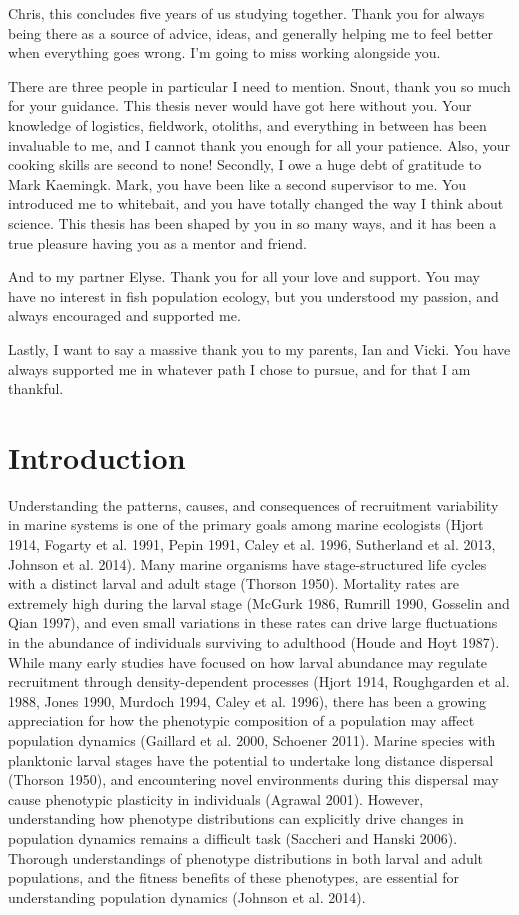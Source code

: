 \documentclass[]{book}
\begin{document}
Chris, this concludes five years of us studying together. Thank you for
always being there as a source of advice, ideas, and generally helping
me to feel better when everything goes wrong. I'm going to miss working
alongside you.

There are three people in particular I need to mention. Snout, thank you
so much for your guidance. This thesis never would have got here without
you. Your knowledge of logistics, fieldwork, otoliths, and everything in
between has been invaluable to me, and I cannot thank you enough for all
your patience. Also, your cooking skills are second to none! Secondly, I
owe a huge debt of gratitude to Mark Kaemingk. Mark, you have been like
a second supervisor to me. You introduced me to whitebait, and you have
totally changed the way I think about science. This thesis has been
shaped by you in so many ways, and it has been a true pleasure having
you as a mentor and friend.

And to my partner Elyse. Thank you for all your love and support. You
may have no interest in fish population ecology, but you understood my
passion, and always encouraged and supported me.

Lastly, I want to say a massive thank you to my parents, Ian and Vicki.
You have always supported me in whatever path I chose to pursue, and for
that I am thankful.

\chapter{Introduction}\label{introduction}

Understanding the patterns, causes, and consequences of recruitment
variability in marine systems is one of the primary goals among marine
ecologists (Hjort 1914, Fogarty et al. 1991, Pepin 1991, Caley et al.
1996, Sutherland et al. 2013, Johnson et al. 2014). Many marine
organisms have stage-structured life cycles with a distinct larval and
adult stage (Thorson 1950). Mortality rates are extremely high during
the larval stage (McGurk 1986, Rumrill 1990, Gosselin and Qian 1997),
and even small variations in these rates can drive large fluctuations in
the abundance of individuals surviving to adulthood (Houde and Hoyt
1987). While many early studies have focused on how larval abundance may
regulate recruitment through density-dependent processes (Hjort 1914,
Roughgarden et al. 1988, Jones 1990, Murdoch 1994, Caley et al. 1996),
there has been a growing appreciation for how the phenotypic composition
of a population may affect population dynamics (Gaillard et al. 2000,
Schoener 2011). Marine species with planktonic larval stages have the
potential to undertake long distance dispersal (Thorson 1950), and
encountering novel environments during this dispersal may cause
phenotypic plasticity in individuals (Agrawal 2001). However,
understanding how phenotype distributions can explicitly drive changes
in population dynamics remains a difficult task (Saccheri and Hanski
2006). Thorough understandings of phenotype distributions in both larval
and adult populations, and the fitness benefits of these phenotypes, are
essential for understanding population dynamics (Johnson et al. 2014).
\end{document}
